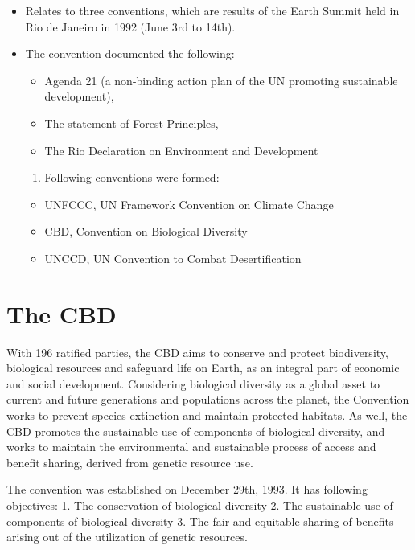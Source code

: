 \documentclass[]{book}
\providecommand{\tightlist}{%
  \setlength{\itemsep}{0pt}\setlength{\parskip}{0pt}}
\begin{document}
\begin{itemize}
\tightlist
\item
  Relates to three conventions, which are results of the Earth Summit held in Rio de Janeiro in 1992 (June 3rd to 14th).
\item
  The convention documented the following:

  \begin{itemize}
  \tightlist
  \item
    Agenda 21 (a non-binding action plan of the UN promoting sustainable development),
  \item
    The statement of Forest Principles,
  \item
    The Rio Declaration on Environment and Development
  \end{itemize}

  \begin{enumerate}
  \def\labelenumi{\arabic{enumi}.}
  \setcounter{enumi}{61}
  \tightlist
  \item
    Following conventions were formed:
  \end{enumerate}

  \begin{itemize}
  \tightlist
  \item
    UNFCCC, UN Framework Convention on Climate Change
  \item
    CBD, Convention on Biological Diversity
  \item
    UNCCD, UN Convention to Combat Desertification
  \end{itemize}
\end{itemize}

\hypertarget{the-cbd}{%
\section{The CBD}\label{the-cbd}}

With 196 ratified parties, the CBD aims to conserve and protect biodiversity, biological resources and safeguard life on Earth, as an integral part of economic and social development. Considering biological diversity as a global asset to current and future generations and populations across the planet, the Convention works to prevent species extinction and maintain protected habitats. As well, the CBD promotes the sustainable use of components of biological diversity, and works to maintain the environmental and sustainable process of access and benefit sharing, derived from genetic resource use.

The convention was established on December 29th, 1993. It has following objectives:
1. The conservation of biological diversity
2. The sustainable use of components of biological diversity
3. The fair and equitable sharing of benefits arising out of the utilization of genetic resources.
\end{document}
